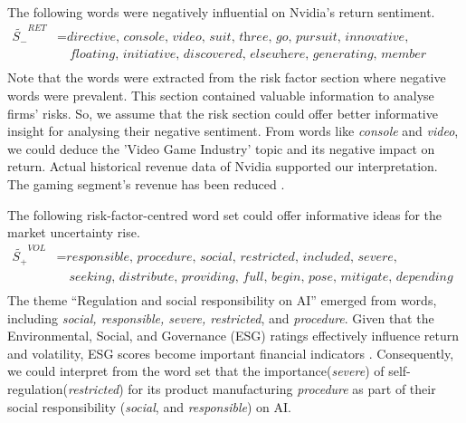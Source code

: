 \documentclass[logo,bsc,singlespacing,parskip]{infthesis}
\begin{document}
The following words were negatively influential on Nvidia’s return sentiment.
\begin{align*}
\tilde{S_{-}}^{RET} &= \textit{directive, console, video, suit, three, go, pursuit, innovative, interested,} \\
               &\quad \textit{floating, initiative, discovered, elsewhere, generating, member} \\
\end{align*}
Note that the words were extracted from the risk factor section where negative words were prevalent. This section contained valuable information to analyse firms’ risks. So, we assume that the risk section could offer better informative insight for analysing their negative sentiment. From words like \textit{console} and \textit{video}, we could deduce the 'Video Game Industry' topic and its negative impact on return. Actual historical revenue data of Nvidia supported our interpretation. The gaming segment's revenue has been reduced \cite{nvidia_2023}. 
 
The following risk-factor-centred word set could offer informative ideas for the market uncertainty rise. 
\begin{align*}
\tilde{S_{+}}^{VOL} &= \textit{responsible, procedure, social, restricted, included, severe, forecasting, } \\
               &\quad \textit{seeking, distribute, providing, full, begin, pose, mitigate, depending} \\
\end{align*}
The theme “Regulation and social responsibility on AI” emerged from words, including \textit{social, responsible, severe, restricted}, and \textit{procedure}. Given that the Environmental, Social, and Governance (ESG) ratings effectively influence return and volatility, ESG scores become important financial indicators \cite{latorre2020esg, capelleblancard2019esg, giese2019foundations}. Consequently,  we could interpret from the word set that the importance(\textit{severe}) of self-regulation(\textit{restricted}) for its product manufacturing \textit{procedure} as part of their social responsibility (\textit{social}, and \textit{responsible}) on AI.
\end{document}
